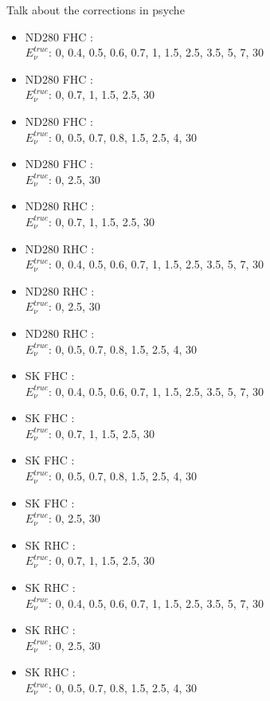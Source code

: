 Talk about the corrections in psyche
\begin{itemize}
  \item ND280 FHC \numu:\\
    $E_\nu^{true}$: 0, 0.4, 0.5, 0.6, 0.7, 1, 1.5, 2.5, 3.5, 5, 7, 30

  \item ND280 FHC \numubar:\\
    $E_\nu^{true}$: 0, 0.7, 1, 1.5, 2.5, 30

  \item ND280 FHC \nue:\\
    $E_\nu^{true}$: 0, 0.5, 0.7, 0.8, 1.5, 2.5, 4, 30

  \item ND280 FHC \nuebar:\\
    $E_\nu^{true}$: 0, 2.5, 30

  \item ND280 RHC \numu:\\
    $E_\nu^{true}$: 0, 0.7, 1, 1.5, 2.5, 30

  \item ND280 RHC \numubar:\\
    $E_\nu^{true}$: 0, 0.4, 0.5, 0.6, 0.7, 1, 1.5, 2.5, 3.5, 5, 7, 30

  \item ND280 RHC \nue:\\
    $E_\nu^{true}$: 0, 2.5, 30

  \item ND280 RHC \nuebar:\\
    $E_\nu^{true}$: 0, 0.5, 0.7, 0.8, 1.5, 2.5, 4, 30

  \item SK FHC \numu:\\
    $E_\nu^{true}$: 0, 0.4, 0.5, 0.6, 0.7, 1, 1.5, 2.5, 3.5, 5, 7, 30

  \item SK FHC \numubar:\\
    $E_\nu^{true}$: 0, 0.7, 1, 1.5, 2.5, 30

  \item SK FHC \nue:\\
    $E_\nu^{true}$: 0, 0.5, 0.7, 0.8, 1.5, 2.5, 4, 30

  \item SK FHC \nuebar:\\
    $E_\nu^{true}$: 0, 2.5, 30
    
  \item SK RHC \numu:\\
    $E_\nu^{true}$: 0, 0.7, 1, 1.5, 2.5, 30

  \item SK RHC \numubar:\\
    $E_\nu^{true}$: 0, 0.4, 0.5, 0.6, 0.7, 1, 1.5, 2.5, 3.5, 5, 7, 30

  \item SK RHC \nue:\\
    $E_\nu^{true}$: 0, 2.5, 30

  \item SK RHC \nuebar:\\
    $E_\nu^{true}$: 0, 0.5, 0.7, 0.8, 1.5, 2.5, 4, 30
\end{itemize}



